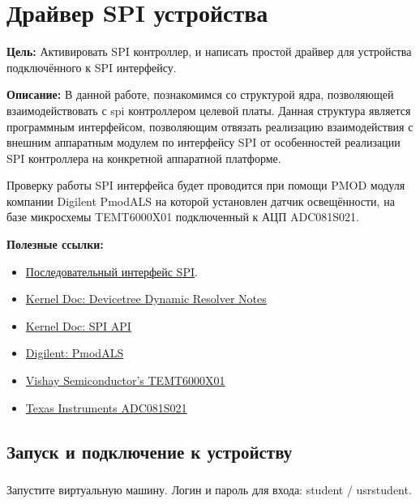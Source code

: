 \chapter{Драйвер SPI устройства}
\textbf{Цель:} Активировать SPI контроллер, и написать простой драйвер для устройства подключённого к SPI интерфейсу.

\vspace{5mm}
\textbf{Описание:} В данной работе, познакомимся со структурой ядра, позволяющей взаимодействовать с spi контроллером целевой платы. Данная структура является программным интерфейсом, позволяющим отвязать реализацию взаимодействия с внешним аппаратным модулем по интерфейсу SPI от особенностей реализации SPI контроллера на конкретной аппаратной платформе.

Проверку работы SPI интерфейса будет проводится при помощи PMOD модуля компании Digilent PmodALS на которой установлен датчик освещённости, на базе микросхемы TEMT6000X01 подключенный к АЦП ADC081S021.

\vspace{5mm}
\textbf{Полезные ссылки:}
\begin{itemize}
	\item \href{http://www.gaw.ru/html.cgi/txt/interface/spi/index.htm}{Последовательный интерфейс SPI}.
	\item \href{https://docs.kernel.org/devicetree/dynamic-resolution-notes.html}{Kernel Doc: Devicetree Dynamic Resolver Notes}
	\item \href{https://www.kernel.org/doc/html/v4.15/driver-api/spi.html}{Kernel Doc: SPI API}	
	\item \href{https://digilent.com/reference/pmod/pmodals/start}{Digilent: PmodALS}
	\item \href{https://www.vishay.com/docs/81579/temt6000.pdf}{Vishay Semiconductor's TEMT6000X01}
	\item \href{https://static.chipdip.ru/lib/311/DOC018311920.pdf}{Texas Instruments ADC081S021}
\end{itemize}


\section{Запуск и подключение к устройству}

\subsection{} Запустите виртуальную машину. Логин и пароль для входа: student / usrstudent.


